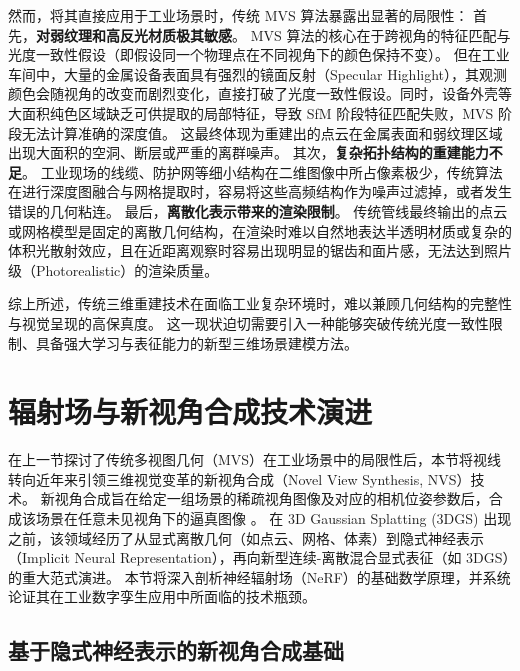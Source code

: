 然而，将其直接应用于工业场景时，传统 MVS 算法暴露出显著的局限性：
首先，\textbf{对弱纹理和高反光材质极其敏感}。
MVS 算法的核心在于跨视角的特征匹配与光度一致性假设（即假设同一个物理点在不同视角下的颜色保持不变）。
但在工业车间中，大量的金属设备表面具有强烈的镜面反射（Specular Highlight），其观测颜色会随视角的改变而剧烈变化，直接打破了光度一致性假设。同时，设备外壳等大面积纯色区域缺乏可供提取的局部特征，导致 SfM 阶段特征匹配失败，MVS 阶段无法计算准确的深度值。
这最终体现为重建出的点云在金属表面和弱纹理区域出现大面积的空洞、断层或严重的离群噪声。
其次，\textbf{复杂拓扑结构的重建能力不足}。
工业现场的线缆、防护网等细小结构在二维图像中所占像素极少，传统算法在进行深度图融合与网格提取时，容易将这些高频结构作为噪声过滤掉，或者发生错误的几何粘连。
最后，\textbf{离散化表示带来的渲染限制}。
传统管线最终输出的点云或网格模型是固定的离散几何结构，在渲染时难以自然地表达半透明材质或复杂的体积光散射效应，且在近距离观察时容易出现明显的锯齿和面片感，无法达到照片级（Photorealistic）的渲染质量。

综上所述，传统三维重建技术在面临工业复杂环境时，难以兼顾几何结构的完整性与视觉呈现的高保真度。
这一现状迫切需要引入一种能够突破传统光度一致性限制、具备强大学习与表征能力的新型三维场景建模方法。


\section{辐射场与新视角合成技术演进}
\label{sec:nvs_evolution}

在上一节探讨了传统多视图几何（MVS）在工业场景中的局限性后，本节将视线转向近年来引领三维视觉变革的新视角合成（Novel View Synthesis, NVS）技术。
新视角合成旨在给定一组场景的稀疏视角图像及对应的相机位姿参数后，合成该场景在任意未见视角下的逼真图像 。
在 3D Gaussian Splatting (3DGS) 出现之前，该领域经历了从显式离散几何（如点云、网格、体素）到隐式神经表示（Implicit Neural Representation），再向新型连续-离散混合显式表征（如 3DGS）的重大范式演进。
本节将深入剖析神经辐射场（NeRF）的基础数学原理，并系统论证其在工业数字孪生应用中所面临的技术瓶颈。

\subsection{基于隐式神经表示的新视角合成基础}
\label{subsec:nerf_basics}

